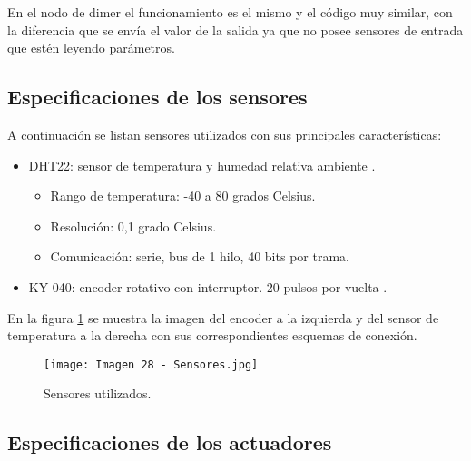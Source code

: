 En el nodo de dimer el funcionamiento es el mismo y el código muy similar, con la diferencia que se envía el valor de la salida ya que no posee sensores de entrada que estén leyendo parámetros.

\subsection{Especificaciones de los sensores}

A continuación se listan sensores utilizados con sus principales características:

\begin{itemize}
	\item DHT22: sensor de temperatura y humedad relativa ambiente \citep{31}.
	\begin{itemize}
		\item Rango de temperatura: -40 a 80 grados Celsius.
		\item Resolución: 0,1 grado Celsius.
		\item Comunicación: serie, bus de 1 hilo, 40 bits por trama.
	\end{itemize}
	\item KY-040: encoder rotativo con interruptor. 20 pulsos por vuelta \citep{32}.
\end{itemize}

En la figura \ref{fig:28} se muestra la imagen del encoder a la izquierda y del sensor de temperatura a la derecha con sus correspondientes esquemas de conexión.

\begin{figure}[h]
\centering
\texttt{[image: Imagen 28 - Sensores.jpg]}
\caption[Sensores]{Sensores utilizados.}
\label{fig:28}
\end{figure}

\subsection{Especificaciones de los actuadores}

